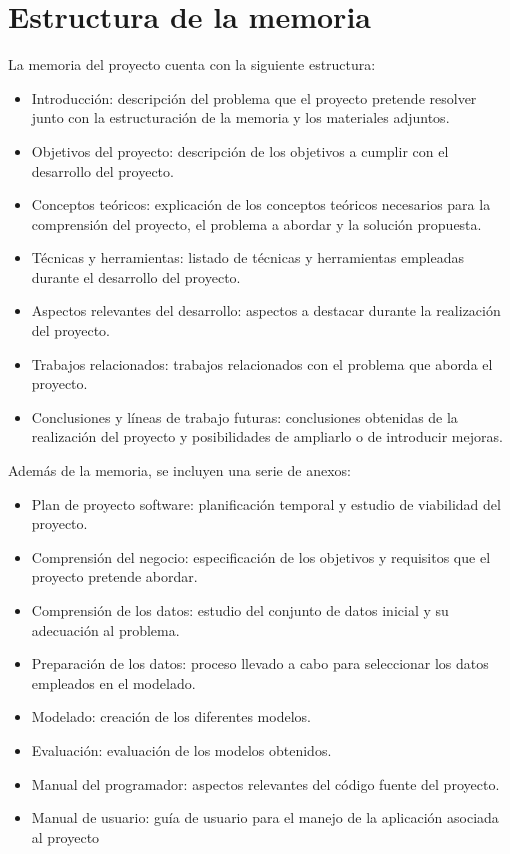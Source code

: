 \section{Estructura de la memoria}
La memoria del proyecto cuenta con la siguiente estructura:
\begin{itemize}
    \item Introducción: descripción del problema que el proyecto pretende resolver junto con la estructuración 
        de la memoria y los materiales adjuntos.
    \item Objetivos del proyecto: descripción de los objetivos a cumplir con el desarrollo del proyecto.
    \item Conceptos teóricos: explicación de los conceptos teóricos necesarios para la comprensión del proyecto, 
        el problema a abordar y la solución propuesta.
    \item Técnicas y herramientas: listado de técnicas y herramientas empleadas durante el desarrollo del proyecto.
    \item Aspectos relevantes del desarrollo: aspectos a destacar durante la realización del proyecto.
    \item Trabajos relacionados: trabajos relacionados con el problema que aborda el proyecto.
    \item Conclusiones y líneas de trabajo futuras: conclusiones obtenidas de la realización del proyecto y posibilidades
        de ampliarlo o de introducir mejoras.
\end{itemize}

Además de la memoria, se incluyen una serie de anexos:
\begin{itemize}
    \item Plan de proyecto software: planificación temporal y estudio de viabilidad del proyecto.
    \item Comprensión del negocio: especificación de los objetivos y requisitos que el proyecto pretende abordar.
    \item Comprensión de los datos: estudio del conjunto de datos inicial y su adecuación al problema.
    \item Preparación de los datos: proceso llevado a cabo para seleccionar los datos empleados en el modelado.
    \item Modelado: creación de los diferentes modelos.
    \item Evaluación: evaluación de los modelos obtenidos.
    \item Manual del programador: aspectos relevantes del código fuente del proyecto.
    \item Manual de usuario: guía de usuario para el manejo de la aplicación asociada al proyecto
\end{itemize}

